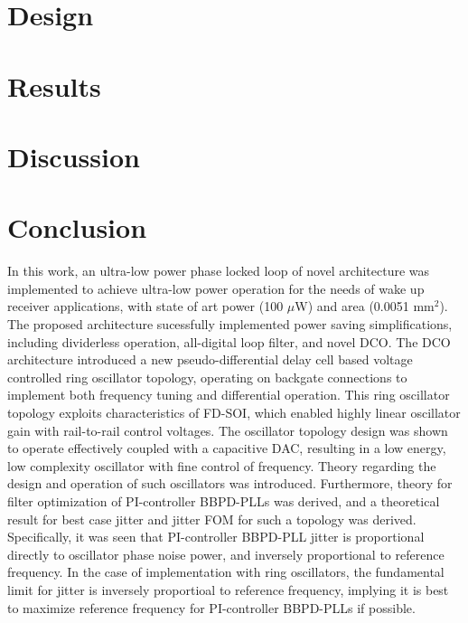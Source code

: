 	\section{Design}\label{design}
	
	
	\FloatBarrier\pagebreak
	\section{Results}\label{results}
	

	\FloatBarrier\pagebreak

	\section{Discussion}\label{disco}
    

    \FloatBarrier

    \pagebreak
    \section{Conclusion} \label{conclusion}

    In this work, an ultra-low power phase locked loop of novel architecture was implemented to achieve ultra-low power operation for the needs of wake up receiver applications, with state of art power (100 $\mu$W) and area (0.0051 mm$^2$). The proposed architecture sucessfully implemented power saving simplifications, including dividerless operation, all-digital loop filter, and novel DCO. The DCO architecture introduced a new pseudo-differential delay cell based voltage controlled ring oscillator topology, operating on backgate connections to implement both frequency tuning and differential operation. This ring oscillator topology exploits characteristics of FD-SOI, which enabled highly linear oscillator gain with rail-to-rail control voltages. The oscillator topology design was shown to operate effectively coupled with a capacitive DAC, resulting in a low energy, low complexity oscillator with fine control of frequency. Theory regarding the design and operation of such oscillators was introduced. Furthermore, theory for filter optimization of PI-controller BBPD-PLLs was derived, and a theoretical result for best case jitter and jitter FOM for such a topology was derived. Specifically, it was seen that PI-controller BBPD-PLL jitter is proportional directly to oscillator phase noise power, and inversely proportional to reference frequency. In the case of implementation with ring oscillators, the fundamental limit for jitter is inversely proportioal to reference frequency, implying it is best to maximize reference frequency for PI-controller BBPD-PLLs if possible.


    \pagebreak
	\printbibliography


	\pagebreak
	


